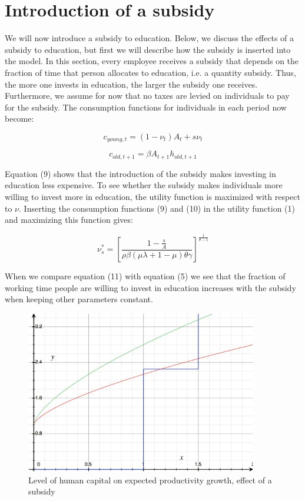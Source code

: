 \documentclass[a4paper,11pt]{article} %
\begin{document}
\section{Introduction of a subsidy}
We will now introduce a subsidy to education. Below, we discuss the effects of a subsidy to education, but first we will describe how the subsidy is inserted into the model. In this section, every employee receives a subsidy that depends on the fraction of time that person allocates to education, i.e. a quantity subsidy. Thus, the more one invests in education, the larger the subsidy one receives. Furthermore, we assume for now that no taxes are levied on individuals to pay for the subsidy. The consumption functions for individuals in each period now become:

\begin{equation}
  c_{young,t}= \left( 1-\nu_t \right)A_t+s\nu_t
\end{equation}

\begin{equation}
  c_{old,t+1}= \beta A_{t+1}h_{old,t+1}
\end{equation}

Equation (9) shows that the introduction of the subsidy makes investing in education less expensive. To see whether the subsidy makes individuals more willing to invest more in education, the utility function is maximized with respect to \(\nu\). Inserting the consumption functions (9) and (10) in the utility function (1) and maximizing this function gives: 

\begin{equation}
  \nu^*_s= \left[ \frac{ 1-\frac{s}{A} }
    {\rho\beta \left( \mu\lambda+1-\mu \right) \theta\gamma} \right]
  ^{\frac{1}{\theta-1}}
\end{equation}

When we compare equation (11) with equation (5) we see that the fraction of working time people are willing to invest in education increases with the subsidy when keeping other parameters constant. 

\begin{figure}
  \centering
  \includegraphics[width=0.9\textwidth]{figure4.png}
  \caption{Level of human capital on expected productivity growth, effect of a subsidy}
\end{figure}
\end{document}
